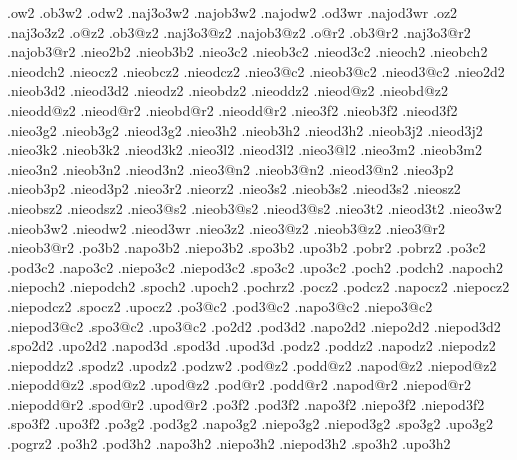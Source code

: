 {  .ow2    .ob3w2    .odw2        .naj3o3w2    .najob3w2    .najodw2
                    .od3wr                                 .najod3wr
  .oz2                           .naj3o3z2    
  .o@z2   .ob3@z2                .naj3o3@z2   .najob3@z2
  .o@r2   .ob3@r2                .naj3o3@r2   .najob3@r2
%
  .nieo2b2     .nieob3b2
  .nieo3c2     .nieob3c2    .nieod3c2
  .nieoch2     .nieobch2    .nieodch2      
  .nieocz2     .nieobcz2    .nieodcz2 
  .nieo3@c2    .nieob3@c2   .nieod3@c2       
  .nieo2d2     .nieob3d2    .nieod3d2       
  .nieodz2     .nieobdz2    .nieoddz2
  .nieod@z2    .nieobd@z2   .nieodd@z2  
  .nieod@r2    .nieobd@r2   .nieodd@r2  
  .nieo3f2     .nieob3f2    .nieod3f2    
  .nieo3g2     .nieob3g2    .nieod3g2    
  .nieo3h2     .nieob3h2    .nieod3h2
               .nieob3j2    .nieod3j2        
  .nieo3k2     .nieob3k2    .nieod3k2        
  .nieo3l2                  .nieod3l2
  .nieo3@l2           
  .nieo3m2     .nieob3m2  
  .nieo3n2     .nieob3n2    .nieod3n2
  .nieo3@n2    .nieob3@n2   .nieod3@n2       
  .nieo3p2     .nieob3p2    .nieod3p2       
  .nieo3r2            
  .nieorz2          
  .nieo3s2     .nieob3s2    .nieod3s2       
  .nieosz2     .nieobsz2    .nieodsz2     
  .nieo3@s2    .nieob3@s2   .nieod3@s2       
  .nieo3t2                  .nieod3t2
  .nieo3w2     .nieob3w2    .nieodw2   
                            .nieod3wr
  .nieo3z2            
  .nieo3@z2    .nieob3@z2       
  .nieo3@r2    .nieob3@r2       
%
%
  .po3b2             .napo3b2   .niepo3b2                .spo3b2  .upo3b2  
  .pobr2            
  .pobrz2           
  .po3c2   .pod3c2   .napo3c2   .niepo3c2   .niepod3c2   .spo3c2  .upo3c2  
  .poch2   .podch2   .napoch2   .niepoch2   .niepodch2   .spoch2  .upoch2  
  .pochrz2          
  .pocz2   .podcz2   .napocz2   .niepocz2   .niepodcz2   .spocz2  .upocz2  
  .po3@c2  .pod3@c2  .napo3@c2  .niepo3@c2  .niepod3@c2  .spo3@c2 .upo3@c2 
  .po2d2   .pod3d2   .napo2d2   .niepo2d2   .niepod3d2   .spo2d2  .upo2d2  
                     .napod3d                            .spod3d  .upod3d
  .podz2   .poddz2   .napodz2   .niepodz2   .niepoddz2   .spodz2  .upodz2
  .podzw2
  .pod@z2  .podd@z2  .napod@z2  .niepod@z2  .niepodd@z2  .spod@z2 .upod@z2
  .pod@r2  .podd@r2  .napod@r2  .niepod@r2  .niepodd@r2  .spod@r2 .upod@r2
  .po3f2   .pod3f2   .napo3f2   .niepo3f2   .niepod3f2   .spo3f2  .upo3f2  
  .po3g2   .pod3g2   .napo3g2   .niepo3g2   .niepod3g2   .spo3g2  .upo3g2  
  .pogrz2           
  .po3h2   .pod3h2   .napo3h2   .niepo3h2   .niepod3h2   .spo3h2  .upo3h2  
}
